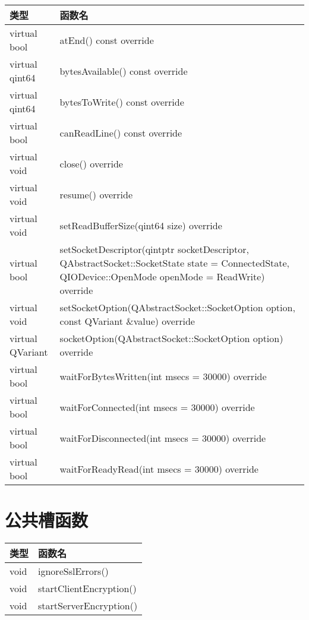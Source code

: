 \begin{longtable}[l]{|l|m{30em}|}
\hline 
类型 &	函数名\\ 
\hline 
virtual bool &	atEnd() const override \\ 
\hline
virtual qint64 	&bytesAvailable() const override \\ 
\hline
virtual qint64 &	bytesToWrite() const override \\ 
\hline
virtual bool &	canReadLine() const override \\ 
\hline
virtual void &	close() override \\
\hline
virtual void &	resume() override \\ 
\hline
virtual void &	setReadBufferSize(qint64 size) override \\ 
\hline
virtual bool &	setSocketDescriptor(qintptr socketDescriptor, QAbstractSocket::SocketState state = ConnectedState, QIODevice::OpenMode openMode = ReadWrite) override \\ 
\hline
virtual void &	setSocketOption(QAbstractSocket::SocketOption option, const QVariant \&value) override \\
\hline
virtual QVariant &	socketOption(QAbstractSocket::SocketOption option) override \\ 
\hline
virtual bool &	waitForBytesWritten(int msecs = 30000) override \\ 
\hline
virtual bool &	waitForConnected(int msecs = 30000) override \\ 
\hline
virtual bool &	waitForDisconnected(int msecs = 30000) override \\ 
\hline
virtual bool &	waitForReadyRead(int msecs = 30000) override \\ 
	\hline
\end{longtable}

\section{公共槽函数}

\begin{tabular}[l]{|l|m{30em}|}
	\hline 
	类型 &	函数名\\ 
	\hline 
	void &	ignoreSslErrors() \\ 
	\hline
	void &	startClientEncryption() \\ 
	\hline
	void &	startServerEncryption() \\ 
	\hline
\end{tabular}


